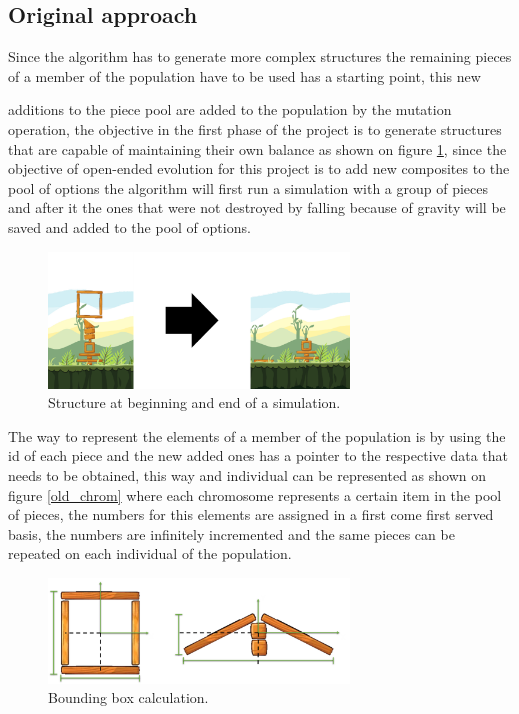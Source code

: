 \documentclass[conference]{IEEEtran}
\begin{document}
\subsection{Original approach}
Since the algorithm has to generate more complex structures the remaining pieces
of a member of the population have to be used has a starting point, this new

additions to the piece pool are added to the population by the mutation
operation, the objective in the first phase of the project is to generate
structures that are capable of maintaining their own balance as shown on figure
\ref{test_old}, since the objective of open-ended evolution for this project is
to add new composites to the pool of options the algorithm will first run a
simulation with a group of pieces and after it the ones that were not destroyed
by falling because of gravity will be saved and added to the pool of options.



\begin{figure}[htbp]
\centerline{\includegraphics[width=80mm]{Images/simulation_bef_aft_example.png}}
\caption{Structure at beginning and end of a simulation.}
\label{test_old}
\end{figure}

The way to represent the elements of a member of the population is by using the
id of each piece and the new added ones has a pointer to the respective data
that needs to be obtained, this way and individual can be represented as shown
on figure \ref{old_chrom} where each chromosome represents a certain item in the
pool of pieces, the numbers for this elements are assigned in a first come first
served basis, the numbers are infinitely incremented and the same pieces can be
repeated on each individual of the population.

\begin{figure}[htbp]
\centerline{\includegraphics[width=80mm]{Images/bounding_box_calculation.png}}
\caption{Bounding box calculation.}
\label{bounding_boc_calc}
\end{figure}
\end{document}
